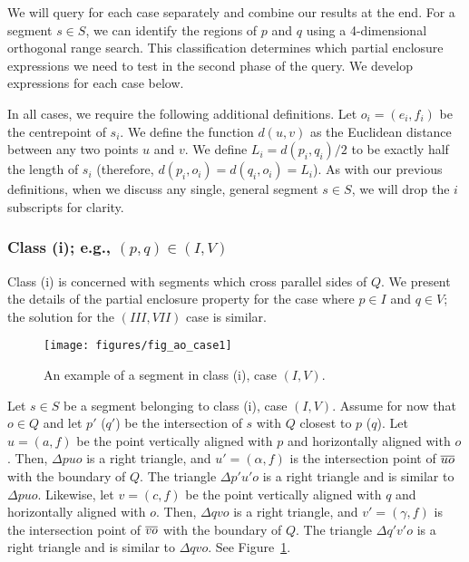 We will query for each case separately and combine our results at the end. 
For a segment $s \in S$, we can identify the regions of $p$ and $q$ using a 4-dimensional orthogonal range search. 
This classification determines which partial enclosure expressions we need to test in the second phase of the query. We develop expressions for each case below. 

In all cases, we require the following additional definitions. Let $o_i = (e_i, f_i)$ be the centrepoint of $s_i$.
We define the function $d(u,v)$ as the Euclidean distance between any two points $u$ and $v$.
We define $L_i = d(p_i, q_i)/2$ to be exactly half the length of $s_i$ (therefore, $d(p_i, o_i) = d(q_i, o_i) = L_i$).
As with our previous definitions, when we discuss any single, general segment $s \in S$, we will drop the $i$ subscripts for clarity.


\subsubsection{Class (i); e.g., $(p, q) \in (I, V)$}
\label{:rectangles:ao:class1}

Class (i) is concerned with segments which cross parallel sides of $Q$. 
We present the details of the partial enclosure property for the case where $p \in I$ and $q \in V$; the solution for the $(III, VII)$ case is similar.

\begin{figure}[t]
\begin{center}
  \texttt{[image: figures/fig\_ao\_case1]}
  \caption{An example of a segment in class (i), case $(I, V)$.}
  \label{fig:rectangles:ao:case1}
\end{center}
\end{figure}

Let $s \in S$ be a segment belonging to class (i), case $(I, V)$.
Assume for now that $o \in Q$ and let $p'$ ($q'$) be the intersection of $s$ with $Q$ closest to $p$ ($q$).  
Let $u = (a, f)$ be the point vertically aligned with $p$ and horizontally aligned with $o$. Then, $\Delta p u o$ is a right triangle, and $u' = (\alpha, f)$ is the intersection point of $\overline{u o}$ with the boundary of $Q$.  
The triangle $\Delta p' u' o$ is a right triangle and is similar to $\Delta p u o$. 
Likewise, let $v = (c, f)$ be the point vertically aligned with $q$ and horizontally aligned with $o$.
Then, $\Delta q v o$ is a right triangle, and $v' = (\gamma, f)$ is the intersection point of $\overline{v o}$ with the boundary of $Q$. 
The triangle $\Delta q' v' o$ is a right triangle and is similar to $\Delta q v o$. See Figure~\ref{fig:rectangles:ao:case1}.

